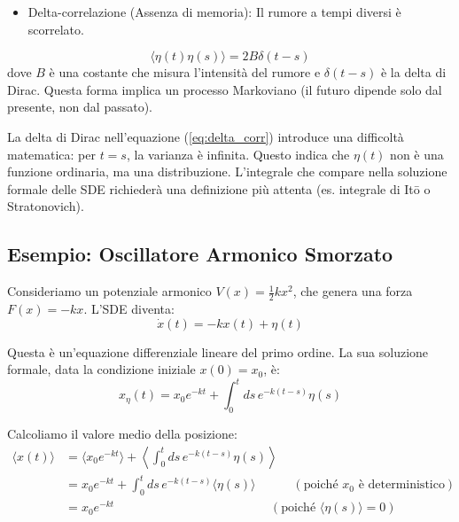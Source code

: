 \begin{itemize}
    \item Delta-correlazione (Assenza di memoria): Il rumore a tempi diversi è scorrelato.
\end{itemize}
\begin{equation}
\label{eq:delta_corr}
\langle \eta(t) \eta(s) \rangle = 2B \delta(t-s)
\end{equation}
dove $B$ è una costante che misura l'intensità del rumore e $\delta(t-s)$ è la delta di Dirac. Questa forma implica un processo Markoviano (il futuro dipende solo dal presente, non dal passato).

\begin{tcolorbox}[colback=colorF!5,colframe=colorF,title=\textbf{!! Attenzione !!}, fonttitle=\bfseries\sffamily, arc=3mm, boxrule=1.2pt]
La delta di Dirac nell'equazione (\ref{eq:delta_corr}) introduce una difficoltà matematica: per $t=s$, la varianza è infinita. Questo indica che $\eta(t)$ non è una funzione ordinaria, ma una distribuzione. L'integrale che compare nella soluzione formale delle SDE richiederà una definizione più attenta (es. integrale di Itō o Stratonovich).
\end{tcolorbox}

\subsection{Esempio: Oscillatore Armonico Smorzato}
Consideriamo un potenziale armonico $V(x) = \frac{1}{2} k x^2$, che genera una forza $F(x) = -k x$.
L'SDE diventa:
\begin{equation}
\dot{x}(t) = -k x(t) + \eta(t)
\end{equation}

Questa è un'equazione differenziale lineare del primo ordine. La sua soluzione formale, data la condizione iniziale $x(0)=x_0$, è:
\begin{equation}
x_\eta(t) = x_0 e^{-kt} + \int_0^t ds \, e^{-k(t-s)} \eta(s)
\end{equation}

Calcoliamo il valore medio della posizione:
\begin{equation}
\begin{aligned}
\langle x(t) \rangle &= \langle x_0 e^{-kt} \rangle + \left\langle \int_0^t ds \, e^{-k(t-s)} \eta(s) \right\rangle \\
&= x_0 e^{-kt} + \int_0^t ds \, e^{-k(t-s)} \langle \eta(s) \rangle \quad \quad \quad  (\text{poiché } x_0 \text{ è deterministico}) \\
&= x_0 e^{-kt} \quad \quad \quad \quad \quad \quad \quad \quad \quad \quad \quad \quad \; \;(\text{poiché } \langle \eta(s) \rangle = 0)
\end{aligned}
\end{equation}

